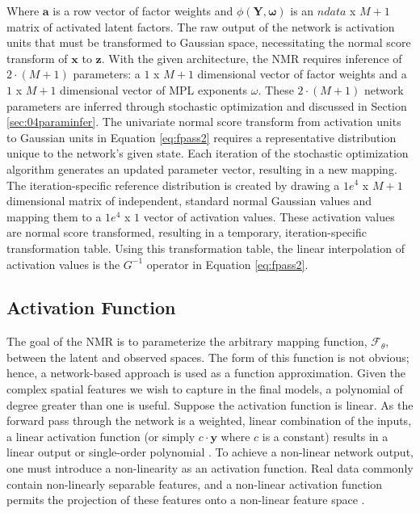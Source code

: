 Where $\mathbf{a}$ is a row vector of factor weights and $\phi\left(\mathbf{Y}, \boldsymbol{\omega} \right)$ is an $ndata$ x $M+1$ matrix of activated latent factors. The raw output of the network is activation units that must be transformed to Gaussian space, necessitating the normal score transform of $\mathbf{x}$ to $\mathbf{z}$. With the given architecture, the \gls{NMR} requires inference of $2 \cdot (M+1)$ parameters: a $1$ x $M+1$ dimensional vector of factor weights and a $1$ x $M+1$ dimensional vector of \gls{MPL} exponents $\omega$. These $2 \cdot (M+1)$ network parameters are inferred through stochastic optimization and discussed in Section \ref{sec:04paraminfer}. The univariate normal score transform from activation units to Gaussian units in Equation \ref{eq:fpass2} requires a representative distribution unique to the network's given state. Each iteration of the stochastic optimization algorithm generates an updated parameter vector, resulting in a new mapping. The iteration-specific reference distribution is created by drawing a $1e^{4}$ x $M+1$ dimensional matrix of independent, standard normal Gaussian values and mapping them to a $1e^{4}$ x $1$ vector of activation values. These activation values are normal score transformed, resulting in a temporary, iteration-specific transformation table. Using this transformation table, the linear interpolation of activation values is the $G^{-1}$ operator in Equation \ref{eq:fpass2}.

\subsection{Activation Function}
\label{subsec:04activation}

The goal of the \gls{NMR} is to parameterize the arbitrary mapping function, $\mathcal{F}_{\theta}$, between the latent and observed spaces. The form of this function is not obvious; hence, a network-based approach is used as a function approximation. Given the complex spatial features we wish to capture in the final models, a polynomial of degree greater than one is useful. Suppose the activation function is linear. As the forward pass through the network is a weighted, linear combination of the inputs, a linear activation function (or simply $c \cdot \mathbf{y}$ where $c$ is a constant) results in a linear output or single-order polynomial \citep{sharma2020activation}. To achieve a non-linear network output, one must introduce a non-linearity as an activation function. Real data commonly contain non-linearly separable features, and a non-linear activation function permits the projection of these features onto a non-linear feature space \citep{dubey2022activation}.


